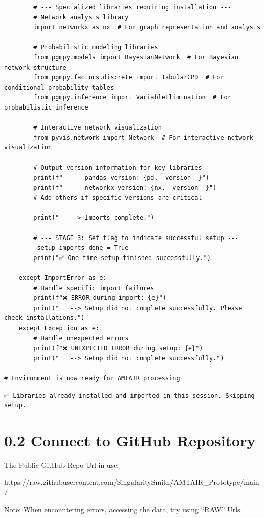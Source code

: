 \documentclass[
  11pt,
  letterpaper,
]{book}
\begin{document}
\begin{verbatim}
        # --- Specialized libraries requiring installation ---
        # Network analysis library
        import networkx as nx  # For graph representation and analysis

        # Probabilistic modeling libraries
        from pgmpy.models import BayesianNetwork  # For Bayesian network structure
        from pgmpy.factors.discrete import TabularCPD  # For conditional probability tables
        from pgmpy.inference import VariableElimination  # For probabilistic inference

        # Interactive network visualization
        from pyvis.network import Network  # For interactive network visualization

        # Output version information for key libraries
        print(f"      pandas version: {pd.__version__}")
        print(f"      networkx version: {nx.__version__}")
        # Add others if specific versions are critical

        print("   --> Imports complete.")

        # --- STAGE 3: Set flag to indicate successful setup ---
        _setup_imports_done = True
        print("✅ One-time setup finished successfully.")

    except ImportError as e:
        # Handle specific import failures
        print(f"❌ ERROR during import: {e}")
        print("   --> Setup did not complete successfully. Please check installations.")
    except Exception as e:
        # Handle unexpected errors
        print(f"❌ UNEXPECTED ERROR during setup: {e}")
        print("   --> Setup did not complete successfully.")

# Environment is now ready for AMTAIR processing
\end{verbatim}

\begin{verbatim}
✅ Libraries already installed and imported in this session. Skipping setup.
\end{verbatim}

\section{0.2 Connect to GitHub
Repository}\label{connect-to-github-repository}

The Public GitHub Repo Url in use:

https://raw.githubusercontent.com/SingularitySmith/AMTAIR\_Prototype/main/

Note: When encountering errors, accessing the data, try using ``RAW''
Urls.
\end{document}
